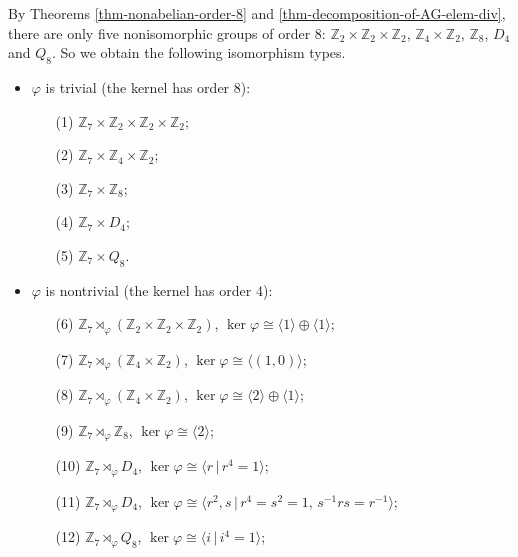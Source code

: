 \begin{example}
	 By Theorems \ref{thm-nonabelian-order-8} and  \ref{thm-decomposition-of-AG-elem-div}, there are only five nonisomorphic groups of order $8$: $\mathbb{Z}_2\times \mathbb{Z}_2\times \mathbb{Z}_2$, $\mathbb{Z}_4\times \mathbb{Z}_2$, $\mathbb{Z}_8$, $D_4$ and $Q_8$. So we obtain the following  isomorphism types.
	\begin{itemize}
		\item $\varphi$ is trivial (the kernel has order $8$):
		\begin{itemize}
			\item[(1)] $\mathbb{Z}_7\times \mathbb{Z}_2\times \mathbb{Z}_2\times \mathbb{Z}_2$;
			\item[(2)] $\mathbb{Z}_7\times \mathbb{Z}_4\times \mathbb{Z}_2$;
			\item[(3)] $\mathbb{Z}_7\times \mathbb{Z}_8$;
			\item[(4)] $\mathbb{Z}_7\times D_4$;
			\item[(5)] $\mathbb{Z}_7\times Q_8$.
		\end{itemize}
		\item $\varphi$ is nontrivial (the kernel has order $4$):
		\begin{itemize}
			\item[(6)] $\mathbb{Z}_7\rtimes_{\varphi} (\mathbb{Z}_2\times \mathbb{Z}_2\times \mathbb{Z}_2)$, $\ker\varphi \cong \langle 1\rangle \oplus \langle 1 \rangle$;
			\item[(7)] $\mathbb{Z}_7\rtimes_{\varphi} (\mathbb{Z}_4\times \mathbb{Z}_2)$, $\ker\varphi \cong \langle (1,0)\rangle$;
			\item[(8)] $\mathbb{Z}_7\rtimes_{\varphi} (\mathbb{Z}_4\times \mathbb{Z}_2)$, $\ker\varphi \cong \langle 2\rangle\oplus \langle 1\rangle$;
			\item[(9)] $\mathbb{Z}_7\rtimes_{\varphi} \mathbb{Z}_8$, $\ker\varphi \cong \langle 2\rangle$;
			\item[(10)] $\mathbb{Z}_7\rtimes_{\varphi} D_4$, $\ker\varphi \cong \langle r\,|\, r^4=1 \rangle$;
			\item[(11)] $\mathbb{Z}_7\rtimes_{\varphi} D_4$, $\ker\varphi \cong \langle r^2,s\,|\, r^4=s^2=1 ,\, s^{-1}rs = r^{-1}\rangle$;
			\item[(12)] $\mathbb{Z}_7\rtimes_{\varphi} Q_8$, $\ker\varphi \cong \langle i\,|\, i^4=1 \rangle$;
		\end{itemize}
	\end{itemize}
	

\end{example}
